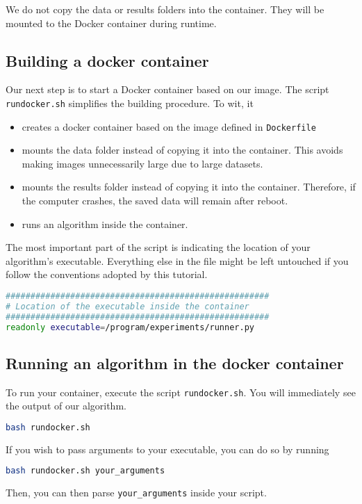\documentclass[12pt, letterpaper, onecolumn]{article}
\begin{document}
We do not copy the data or results folders into the container. They will be mounted to the Docker container during runtime.

\subsection{Building a docker container}

Our next step is to start a Docker container based on our image. The script \texttt{rundocker.sh} simplifies the building procedure. To wit, it \begin{itemize}
	\item creates a docker container based on the image defined in \texttt{Dockerfile}
	\item mounts the data folder instead of copying it into the container. This avoids making images unnecessarily large due to large datasets. 
	\item mounts the results folder instead of copying it into the container. Therefore, if the computer crashes, the saved data will remain after reboot.
	\item runs an algorithm inside the container.
\end{itemize}

The most important part of the script is indicating the location of your algorithm's executable. Everything else in the file might be left untouched if you follow the conventions adopted by this tutorial.

\begin{lstlisting}[language=Bash]
#####################################################
# Location of the executable inside the container
#####################################################
readonly executable=/program/experiments/runner.py
\end{lstlisting}

\subsection{Running an algorithm in the docker container}

To run your container, execute the script \texttt{rundocker.sh}. You will immediately see the output of our algorithm. \begin{lstlisting}[language=Bash]
bash rundocker.sh
\end{lstlisting}  

If you wish to pass arguments to your executable, you can do so by running \begin{lstlisting}[language=Bash]
bash rundocker.sh your_arguments	
\end{lstlisting} Then, you can then parse \texttt{your\_arguments} inside your script.
\end{document}
